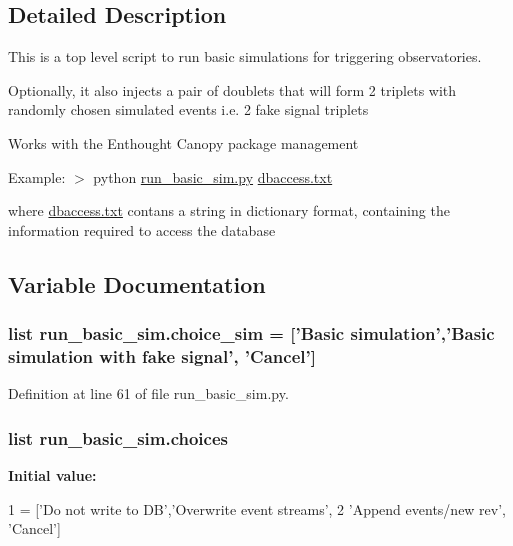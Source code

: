 \subsection{Detailed Description}
\begin{DoxyVerb} This is a top level script to run basic
 simulations for triggering observatories.\end{DoxyVerb}
 Optionally, it also injects a pair of doublets that will form 2 triplets with randomly chosen simulated events i.\-e. 2 fake signal triplets

Works with the Enthought Canopy package management

Example\-: $>$ python \hyperlink{run__basic__sim_8py}{run\-\_\-basic\-\_\-sim.\-py} \hyperlink{dbaccess_8txt}{dbaccess.\-txt}

where \hyperlink{dbaccess_8txt}{dbaccess.\-txt} contans a string in dictionary format, containing the information required to access the database 

\subsection{Variable Documentation}
\hypertarget{namespacerun__basic__sim_a06535363754eeccfe11eb9add16d960c}{
\subsubsection[{choice\-\_\-sim}]{\setlength{\rightskip}{0pt plus 5cm}list run\-\_\-basic\-\_\-sim.\-choice\-\_\-sim = \mbox{[}'Basic simulation','Basic simulation with fake signal', 'Cancel'\mbox{]}}}\label{namespacerun__basic__sim_a06535363754eeccfe11eb9add16d960c}


Definition at line 61 of file run\-\_\-basic\-\_\-sim.\-py.

\hypertarget{namespacerun__basic__sim_a72da00244bdf1f5b3abed724ceadc7ee}{
\subsubsection[{choices}]{\setlength{\rightskip}{0pt plus 5cm}list run\-\_\-basic\-\_\-sim.\-choices}}\label{namespacerun__basic__sim_a72da00244bdf1f5b3abed724ceadc7ee}
{\bfseries Initial value\-:}
\begin{DoxyCode}
1 = [\textcolor{stringliteral}{'Do not write to DB'},\textcolor{stringliteral}{'Overwrite event streams'},
2            \textcolor{stringliteral}{'Append events/new rev'}, \textcolor{stringliteral}{'Cancel'}]
\end{DoxyCode}


